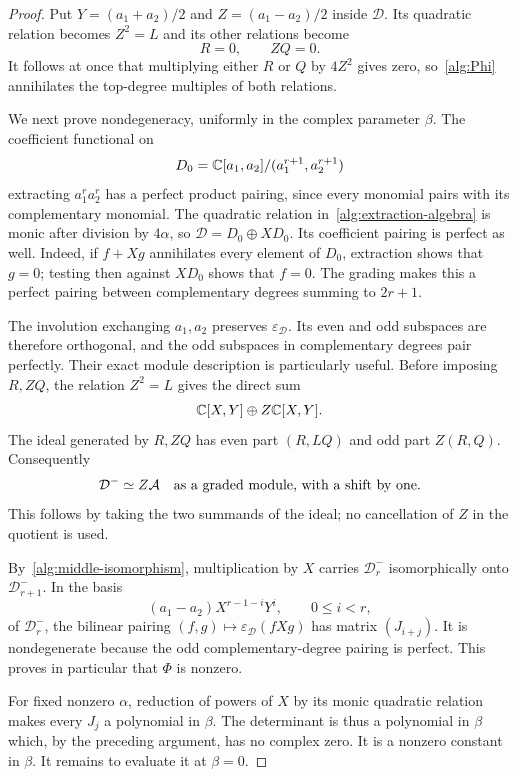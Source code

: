 \begin{proof}
Put $Y=(a_1+a_2)/2$ and $Z=(a_1-a_2)/2$ inside $\mathcal D$.
Its quadratic relation becomes $Z^2=L$ and its other relations become
\[
 R=0,\qquad ZQ=0.
\]
It follows at once that multiplying either $R$ or $Q$ by $4Z^2$ gives
zero, so~\eqref{alg:Phi} annihilates the top-degree multiples of both
relations.

We next prove nondegeneracy, uniformly in the complex parameter $\beta$.
The coefficient functional on
\[
 D_0=\mathbb C[a_1,a_2]/(a_1^{r+1},a_2^{r+1})
\]
extracting $a_1^ra_2^r$ has a perfect product pairing, since every
monomial pairs with its complementary monomial.  The quadratic relation
in~\eqref{alg:extraction-algebra} is monic after division by $4\alpha$,
so $\mathcal D=D_0\oplus XD_0$.  Its coefficient pairing is perfect as
well.  Indeed, if $f+Xg$ annihilates every element of $D_0$, extraction
shows that $g=0$; testing then against $XD_0$ shows that $f=0$.
The grading makes this a perfect pairing between complementary degrees
summing to $2r+1$.

The involution exchanging $a_1,a_2$ preserves
$\varepsilon_{\mathcal D}$.  Its even and odd subspaces are therefore
orthogonal, and the odd subspaces in complementary degrees pair
perfectly.  Their exact module description is particularly useful.
Before imposing $R,ZQ$, the relation $Z^2=L$ gives the direct sum
\[
 \mathbb C[X,Y]\oplus Z\mathbb C[X,Y].
\]
The ideal generated by $R,ZQ$ has even part $(R,LQ)$ and odd part
$Z(R,Q)$.  Consequently
\begin{equation}
 \mathcal D^-\simeq Z\mathcal A
 \quad\hbox{as a graded module, with a shift by one}.
 \label{alg:odd-module}
\end{equation}
This follows by taking the two summands of the ideal; no cancellation
of $Z$ in the quotient is used.

By~\eqref{alg:middle-isomorphism}, multiplication by $X$ carries
$\mathcal D^-_r$ isomorphically onto $\mathcal D^-_{r+1}$.
In the basis
\[
 (a_1-a_2)X^{r-1-i}Y^i,\qquad 0\le i<r,
\]
of $\mathcal D^-_r$, the bilinear pairing
$(f,g)\mapsto\varepsilon_{\mathcal D}(fXg)$ has matrix
$(J_{i+j})$.  It is nondegenerate because the odd complementary-degree
pairing is perfect.  This proves in particular that $\Phi$ is nonzero.

For fixed nonzero $\alpha$, reduction of powers of $X$ by its monic
quadratic relation makes every $J_j$ a polynomial in $\beta$.
The determinant is thus a polynomial in $\beta$ which, by the preceding
argument, has no complex zero.  It is a nonzero constant in $\beta$.
It remains to evaluate it at $\beta=0$.


\end{proof}
